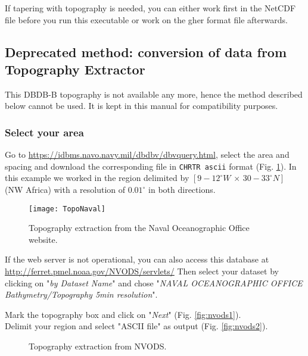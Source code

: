 If tapering with topography is needed, you can either work first in the NetCDF file  before you run this executable or work on the gher format file  afterwards.



\subsection{Deprecated method: conversion of data from Topography Extractor\label{sec:toponavy}}

This DBDB-B topography is not available any more, hence the method described below cannot be used. It is kept in this manual for compatibility purposes.

\subsubsection{Select your area}

Go to \url{https://idbms.navo.navy.mil/dbdbv/dbvquery.html}, select the area and spacing and download the corresponding file in \texttt{CHRTR ascii} format (Fig. \ref{fig:topoextract}). In this example we worked in the region delimited by $[9-12^{\circ}W\, \times\, 30-33^{\circ}N]$ (NW Africa) with a resolution of $0.01^{\circ}$ in both directions. 


\begin{figure}[htpb]
\centering
\texttt{[image: TopoNaval]}
\caption{Topography extraction from the Naval Oceanographic Office website.\label{fig:topoextract}}
\end{figure}

If the web server is not operational, you can also access this database at \url{http://ferret.pmel.noaa.gov/NVODS/servlets/}
Then select your dataset by clicking on "\textsl{by Dataset Name}" and chose 
"\textsl{NAVAL OCEANOGRAPHIC OFFICE Bathymetry/Topography 5min resolution}".

Mark the topography box and click on "\textsl{Next}" (Fig. \ref{fig:nvods1}).\\
Delimit your region and select "ASCII file" as output (Fig. \ref{fig:nvods2}). 


\begin{figure}[htpb]
\centering
{}

\caption{Topography extraction from NVODS.}
\end{figure}


